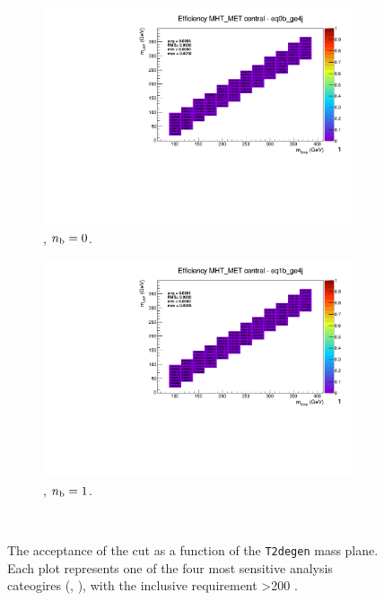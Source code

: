 \begin{figure}[h!]
\begin{subfigure}[b]{0.4\textwidth}
    \includegraphics[width=\textwidth, page=5]{Figs/sms/t2degen/v19/systs_v2/T2_4body_MHT_MET_eq0b_ge4j.pdf}
    \caption{\njhigh, $n_{\text{b}} = 0$.}
  \end{subfigure}
  \begin{subfigure}[b]{0.4\textwidth}
    \includegraphics[width=\textwidth, page=5]{Figs/sms/t2degen/v19/systs_v2/T2_4body_MHT_MET_eq1b_ge4j.pdf}
    \caption{\njhigh, $n_{\text{b}} = 1$.}
  \end{subfigure}\\
  \caption{The acceptance of the \mhtmet cut as a function of the \texttt{T2degen}
  mass plane. Each plot represents one of the four most sensitive 
  analysis cateogires (\nb, \nj), with the inclusive requirement \HT>200 \gev.}
  \label{fig:sms-mhtmet-t2degen}
\end{figure}


